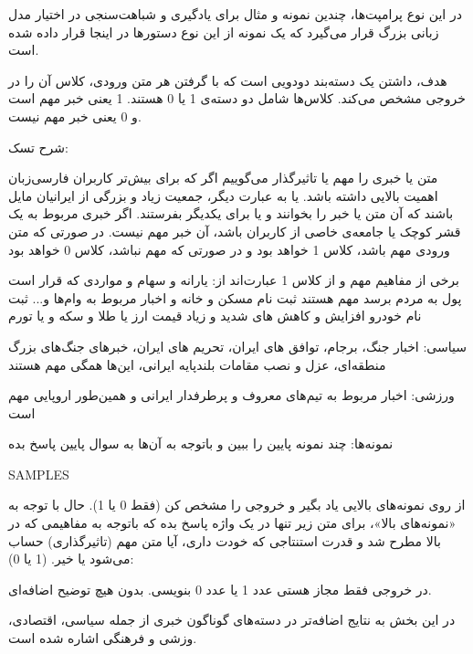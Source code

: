 در این نوع پرامپت‌ها، چندین نمونه و مثال برای یادگیری و شباهت‌سنجی در اختیار مدل زبانی بزرگ قرار می‌گیرد که یک نمونه از این نوع دستورها در اینجا قرار داده شده است.

\vspace{5pt}
\begin{scriptsize}
\begin{itshape}
    هدف، داشتن یک دسته‌بند دودویی است که با گرفتن هر متن ورودی، کلاس آن را در خروجی مشخص می‌کند. کلاس‌ها شامل دو دسته‌ی 1 یا 0 هستند. 1 یعنی خبر مهم است و 0 یعنی خبر مهم نیست.

شرح تسک:

متن یا خبری را مهم یا تاثیرگذار می‌گوییم اگر که برای بیش‌تر کاربران فارسی‌زبان اهمیت بالایی داشته باشد. یا به عبارت دیگر، جمعیت زیاد و بزرگی از ایرانیان مایل باشند که آن متن یا خبر را بخوانند و یا برای یکدیگر بفرستند. اگر خبری مربوط به یک قشر کوچک یا جامعه‌ی خاصی از کاربران باشد، آن خبر مهم نیست.
در صورتی که متن ورودی مهم باشد، کلاس 1 خواهد بود و در صورتی که مهم نباشد، کلاس 0 خواهد بود

برخی از مفاهیم مهم و از کلاس 1 عبارت‌اند از:
یارانه و سهام و مواردی که قرار است پول به مردم برسد مهم هستند
ثبت نام مسکن و خانه و اخبار مربوط به وام‌ها و... 
ثبت نام خودرو
افزایش و کاهش های شدید و زیاد قیمت ارز یا طلا و سکه و یا تورم 

سیاسی:
اخبار جنگ، برجام، توافق های ایران، 
تحریم های ایران، 
خبرهای جنگ‌های بزرگ منطقه‌ای،
عزل و نصب مقامات بلندپایه ایرانی،
این‌ها همگی مهم هستند

ورزشی:
اخبار مربوط به تیم‌های معروف و پرطرفدار ایرانی و همین‌طور اروپایی مهم است


نمونه‌ها: چند نمونه پایین را ببین و باتوجه به آن‌ها به سوال پایین پاسخ بده

SAMPLES

از روی نمونه‌های بالایی یاد بگیر و خروجی را مشخص کن (فقط 0 یا 1).
حال  با توجه به «نمونه‌های بالا»، برای متن زیر تنها در یک واژه پاسخ بده که باتوجه به مفاهیمی که در بالا مطرح شد و قدرت استنتاجی که خودت داری، آیا متن 
مهم (تاثیرگذاری) حساب می‌شود یا خیر. (1 یا 0):

در خروجی فقط مجاز هستی عدد 1 یا عدد 0 بنویسی. بدون هیچ توضیح اضافه‌ای.
\end{itshape}
\end{scriptsize}
\vspace{5pt}






در این بخش به نتایج اضافه‌تر در دسته‌های گوناگون خبری از جمله سیاسی، اقتصادی، وزشی و فرهنگی اشاره شده است.